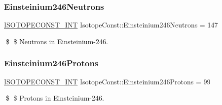 \subsubsection{\texorpdfstring{Einsteinium246\+Neutrons}{Einsteinium246Neutrons}}
{\footnotesize\ttfamily \mbox{\hyperlink{group___isotope_const-_macros_ga5f18360b3e99483a35c32d789e62621c}{I\+S\+O\+T\+O\+P\+E\+C\+O\+N\+S\+T\+\_\+\+I\+NT}} Isotope\+Const\+::\+Einsteinium246\+Neutrons = 147}

\$ \$ Neutrons in Einsteinium-\/246. \mbox{\label{group___isotope_const-_einsteinium-_es246_gaf683a8947cca6b0b0acbab0bf027ae7f}} 
\subsubsection{\texorpdfstring{Einsteinium246\+Protons}{Einsteinium246Protons}}
{\footnotesize\ttfamily \mbox{\hyperlink{group___isotope_const-_macros_ga5f18360b3e99483a35c32d789e62621c}{I\+S\+O\+T\+O\+P\+E\+C\+O\+N\+S\+T\+\_\+\+I\+NT}} Isotope\+Const\+::\+Einsteinium246\+Protons = 99}

\$ \$ Protons in Einsteinium-\/246. 